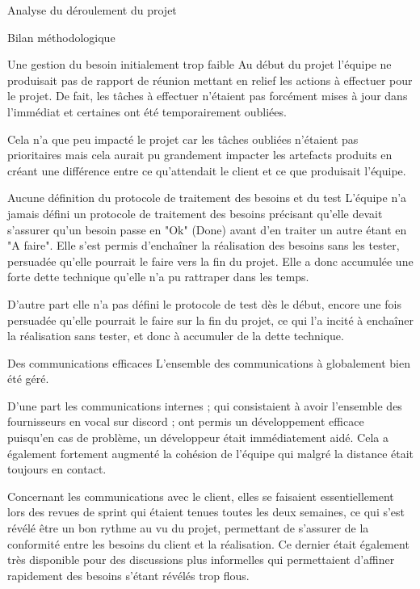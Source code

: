 \documentclass[]{article}
\begin{document}
{\begin{section}{Analyse du déroulement du projet}
\begin{subsection}{Bilan méthodologique}
     \begin{subsubsection}{Une gestion du besoin initialement trop faible}
         Au début du projet l'équipe ne produisait pas de rapport de réunion mettant en relief les actions à effectuer pour le projet. De fait, les tâches à effectuer n'étaient pas forcément mises à jour dans l'immédiat et certaines ont été temporairement oubliées.

         Cela n'a que peu impacté le projet car les tâches oubliées n'étaient pas prioritaires mais cela aurait pu grandement impacter les artefacts produits en créant une différence entre ce qu'attendait le client et ce que produisait l'équipe.
     \end{subsubsection}

     \begin{subsubsection}{Aucune définition du protocole de traitement des besoins et du test}
         L'équipe n'a jamais défini un protocole de traitement des besoins précisant qu'elle devait s'assurer qu'un besoin passe en "Ok" (Done) avant d'en traiter un autre étant en "A faire". Elle s'est permis d'enchaîner la réalisation des besoins sans les tester, persuadée qu'elle pourrait le faire vers la fin du projet. Elle a donc accumulée une forte dette technique qu'elle n'a pu rattraper dans les temps.

         D'autre part elle n'a pas défini le protocole de test dès le début, encore une fois persuadée qu'elle pourrait le faire sur la fin du projet, ce qui l'a incité à enchaîner la réalisation sans tester, et donc à accumuler de la dette technique.
     \end{subsubsection}

     \begin{subsubsection}{Des communications efficaces}
         L'ensemble des communications à globalement bien été géré.

         D'une part les communications internes ; qui consistaient à avoir l'ensemble des fournisseurs en vocal sur discord ; ont permis un développement efficace puisqu'en cas de problème, un développeur était immédiatement aidé. Cela a également fortement augmenté la cohésion de l'équipe qui malgré la distance était toujours en contact.

         Concernant les communications avec le client, elles se faisaient essentiellement lors des revues de sprint qui étaient tenues toutes les deux semaines, ce qui s'est révélé être un bon rythme au vu du projet, permettant de s'assurer de la conformité entre les besoins du client et la réalisation. Ce dernier était également très disponible pour des discussions plus informelles qui permettaient d'affiner rapidement des besoins s'étant révélés trop flous.
     \end{subsubsection}


\end{subsection}
\end{section}}
\end{document}
